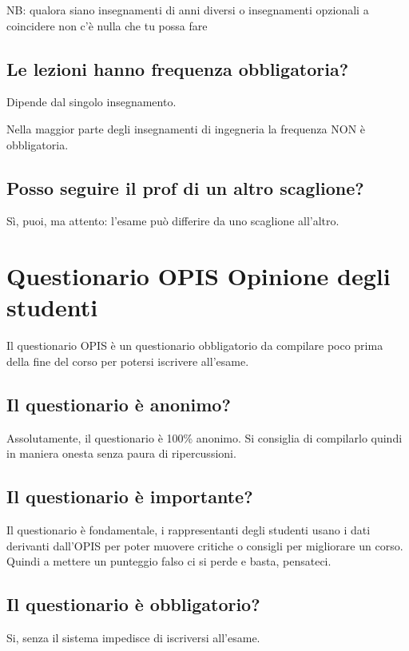 \documentclass[legal]{polinetwork}
\begin{document}
NB: qualora siano insegnamenti di anni diversi o insegnamenti opzionali a coincidere non c'è nulla che tu possa fare

\subsection{Le lezioni hanno frequenza obbligatoria?}


Dipende dal singolo insegnamento.

Nella maggior parte degli insegnamenti di ingegneria la frequenza NON è obbligatoria.

\subsection{Posso seguire il prof di un altro scaglione?}


Sì, puoi, ma attento: l'esame può differire da uno scaglione all'altro.

\section{Questionario OPIS Opinione degli studenti}


Il questionario OPIS è un questionario obbligatorio da compilare poco prima della fine del corso per potersi iscrivere all'esame.

\subsection{Il questionario è anonimo?}


Assolutamente, il questionario è 100\% anonimo. Si consiglia di compilarlo quindi in maniera onesta senza paura di ripercussioni.

\subsection{Il questionario è importante?}


Il questionario è fondamentale, i rappresentanti degli studenti usano i dati derivanti dall'OPIS per poter muovere critiche o consigli per migliorare un corso. Quindi a mettere un punteggio falso ci si perde e basta, pensateci.

\subsection{Il questionario è obbligatorio?}


Si, senza il sistema impedisce di iscriversi all'esame.
\end{document}
